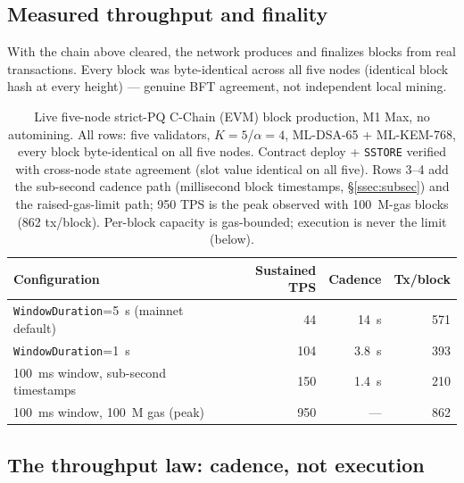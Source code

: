 \subsection{Measured throughput and finality}

With the chain above cleared, the network produces and finalizes blocks
from real transactions. Every block was byte-identical across all five
nodes (identical block hash at every height) --- genuine BFT agreement,
not independent local mining.

\begin{table}[h]
\centering
\small
\begin{tabular}{@{}lrrr@{}}
\toprule
\textbf{Configuration} & \textbf{Sustained TPS} & \textbf{Cadence} & \textbf{Tx/block} \\
\midrule
\texttt{WindowDuration}=\SI{5}{\second} (mainnet default) & 44  & \SI{14}{\second} & 571 \\
\texttt{WindowDuration}=\SI{1}{\second}                   & 104 & \SI{3.8}{\second} & 393 \\
\SI{100}{\milli\second} window, sub-second timestamps    & 150 & \SI{1.4}{\second} & 210 \\
\SI{100}{\milli\second} window, \SI{100}{M} gas (peak)   & 950 & --- & 862 \\
\bottomrule
\end{tabular}
\caption{Live five-node strict-PQ C-Chain (EVM) block production, M1
Max, no automining. All rows: five validators, $K{=}5$/$\alpha{=}4$,
ML-DSA-65 + ML-KEM-768, every block byte-identical on all five nodes.
Contract deploy + \texttt{SSTORE} verified with cross-node state
agreement (slot value identical on all five). Rows 3--4 add the
sub-second cadence path (millisecond block timestamps, \S\ref{ssec:subsec})
and the raised-gas-limit path; \SI{950}{} TPS is the peak observed with
\SI{100}{M}-gas blocks (\SI{862}{} tx/block). Per-block capacity is
gas-bounded; execution is never the limit (below).}
\label{tab:live-consensus}
\end{table}

\subsection{The throughput law: cadence, not execution}

